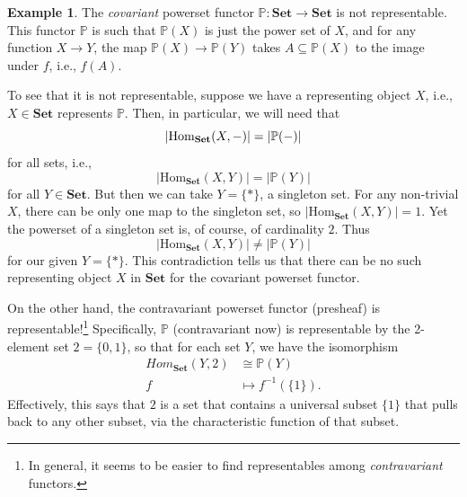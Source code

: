 \documentclass[11pt]{book}
\theoremstyle{definition}
\newtheorem{example}{Example}[section]
\theoremstyle{definition}
\theoremstyle{definition}
\theoremstyle{theorem}
\theoremstyle{definition}
\begin{document}
\begin{example}
	The \textit{covariant} powerset functor $\mathbb{P}: \textbf{Set} \rightarrow \textbf{Set}$ is not representable. This functor $\mathbb{P}$ is such that $\mathbb{P}(X)$ is just the power set of $X$, and for any function $X \rightarrow Y$, the map $\mathbb{P}(X) \rightarrow \mathbb{P}(Y)$ takes $A \subseteq  \mathbb{P}(X)$ to the image under $f$, i.e., $f(A)$. \par 
	To see that it is not representable, suppose we have a representing object $X$, i.e., $X \in \textbf{Set}$ represents $\mathbb{P}$. Then, in particular, we will need that 
	\begin{equation*}
	|\text{Hom}_{\textbf{Set}}(X, \--)| = |\mathbb{P}(\--)|
	\end{equation*}
	for all sets, i.e., 
	\begin{equation*}
	|\text{Hom}_{\textbf{Set}}(X, Y)| = |\mathbb{P}(Y)|
	\end{equation*}
	for all $Y \in \textbf{Set}$. But then we can take $Y = \{*\}$, a singleton set. For any non-trivial $X$, there can be only one map to the singleton set, so $|\text{Hom}_{\textbf{Set}}(X, Y)| = 1$. Yet the powerset of a singleton set is, of course, of cardinality $2$. Thus 
	\begin{equation*}
	|\text{Hom}_{\textbf{Set}}(X, Y)| \neq |\mathbb{P}(Y)|
	\end{equation*} 
	for our given $Y = \{*\}$. This contradiction tells us that there can be no such representing object $X$ in $\textbf{Set}$ for the covariant powerset functor. \par 
	On the other hand, the contravariant powerset functor (presheaf) is representable!\footnote{In general, it seems to be easier to find representables among \textit{contravariant} functors.}  
	Specifically, $\mathbb{P}$ (contravariant now) is representable by the 2-element set $2 = \{0,1\}$, so that for each set $Y$, we have the isomorphism 
	\begin{align*}
	Hom_\textbf{Set}(Y, 2) & \cong \mathbb{P}(Y) \\
	f & \mapsto f^{-1}(\{1\}).
	\end{align*} 
	Effectively, this says that $2$ is a set that contains a universal subset $\{1\}$ that pulls back to any other subset, via the characteristic function of that subset. 
\end{example}
\end{document}
